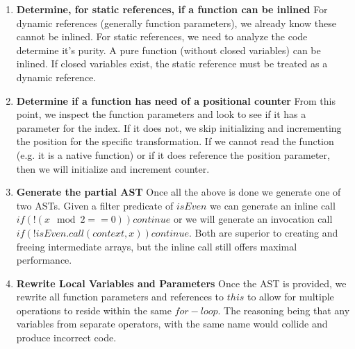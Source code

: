 \begin{enumerate}
  \item \textbf{Determine, for static references, if a function can be inlined}
    For dynamic references (generally  function parameters), we already know these cannot be inlined.  For static references, we need to analyze the code determine it's purity.  A pure function (without closed variables) can be inlined.  If closed variables exist, the static reference must be treated as a dynamic reference.
  \item \textbf{Determine if a function has need of a positional counter}
    From this point, we inspect the function parameters and look to see if it has a parameter for the index.  If it does not, we skip initializing and incrementing the position for the specific transformation.  If we cannot read the function (e.g. it is a native function) or if it does reference the position parameter, then we will initialize and increment counter.
  \item \textbf{Generate the partial AST}
    Once all the above is done we generate one of two ASTs. Given a filter predicate of $isEven$ we can generate an inline call $if (!(x \mod 2 == 0)) continue$ or we will generate an invocation call $if (!isEven.call(context, x)) continue$.  Both are superior to creating and freeing intermediate arrays, but the inline call still offers maximal performance.
  \item \textbf{Rewrite Local Variables and Parameters}
    Once the AST is provided, we rewrite all function parameters and references to $this$ to allow for multiple operations to reside within the same $for-loop$.  The reasoning being that any variables from separate operators, with the same name would collide and produce incorrect code.  
\end{enumerate}